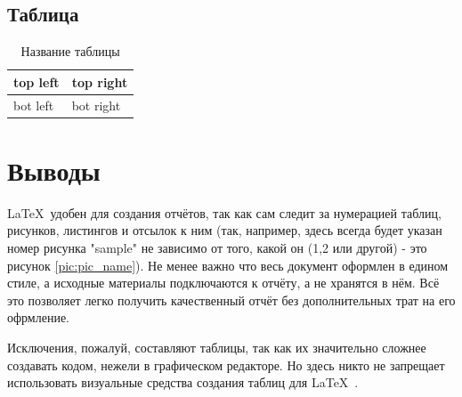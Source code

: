 \subsection*{Таблица}

\begin{table}[H]
	\begin{center}
		\begin{tabular}{|l|l|}
			\hline
			top left & top right\\ \hline
			bot left & bot right\\ \hline
		\end{tabular}
		\caption{ Название таблицы}
		\label{tabular:tab_examp}
	\end{center}
\end{table}

\section*{Выводы}
\LaTeX\ удобен для создания отчётов, так как сам следит за нумерацией таблиц, рисунков, листингов и отсылок к ним (так, например, здесь всегда будет указан номер рисунка "sample" не зависимо от того, какой он (1,2 или другой) - это рисунок \ref{pic:pic_name}). Не менее важно что весь документ оформлен в едином стиле, а исходные материалы подключаются к отчёту, а не хранятся в нём. Всё это позволяет легко получить качественный отчёт без дополнительных трат на его офрмление.

Исключения, пожалуй, составляют таблицы, так как их значительно сложнее создавать кодом, нежели в графическом редакторе. Но здесь никто не запрещает использовать визуальные средства создания таблиц для \LaTeX\ .

